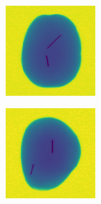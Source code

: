\documentclass[11pt]{article}
\begin{document}
\begin{figure}[!h]
\begin{subfigure}[b]{0.22\textwidth}
         \caption{}
         \label{fig:metal_23}
     \end{subfigure}
     \\
    \begin{subfigure}[b]{0.22\textwidth}
         \centering
         \includegraphics[width=\textwidth]{figurer/potato_dataset/metal/metal_24.jpg}
         \caption{}
         \label{fig:metal_24}
     \end{subfigure}
     \hfill
     \begin{subfigure}[b]{0.22\textwidth}
         \centering
         \includegraphics[width=\textwidth]{figurer/potato_dataset/metal/metal_25.jpg}

\end{subfigure}
\end{figure}
\end{document}
